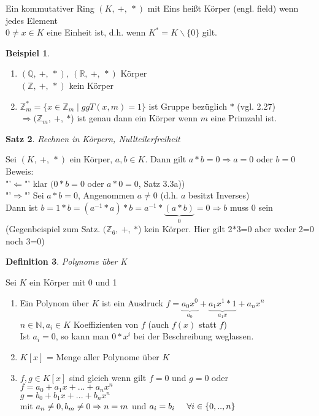 \documentclass[a4paper,11pt]{article}
\newtheorem{definition}{Definition}[section]
\newtheorem{satz}[definition]{Satz}
\newtheorem{bsp}[definition]{Beispiel}
\begin{document}
Ein kommutativer Ring $(K,\:+,\:*)$ mit Eins heißt Körper (engl. field) wenn jedes Element \\ 
$0\neq x\in K$ eine Einheit ist, d.h. wenn $K^*=K\backslash\{0\}$ gilt.
\begin{bsp}
\end{bsp}
\begin{enumerate}[label=\alph*)]
\item $(\mathbb{Q},\:+,\:*),\:(\mathbb{R},\:+,\:*)$ Körper \\
$(\mathbb{Z},\:+,\:*)$ kein Körper
\item $\mathbb{Z}^*_m=\{x\in\mathbb{Z}_m\mid ggT(x,m)=1\}$ ist Gruppe bezüglich \textcircled{$*$} (vgl. 2.27) \\
$\Rightarrow (\mathbb{Z}_m,\:$\textcircled{$+$}$,\:$\textcircled{$*$}) ist genau dann ein Körper wenn $m$ eine Primzahl ist.
\end{enumerate}
\begin{satz}
Rechnen in Körpern, Nullteilerfreiheit
\end{satz}
Sei $(K,\:+,\:*)$ ein Körper, $a,b\in K$. Dann gilt $a*b=0\Rightarrow a=0$ oder $b=0$ \\
Beweis: \\
"'$\Leftarrow$"' klar $(0*b=0$ oder $a*0=0$, Satz 3.3a)) \\
"'$\Rightarrow$"' Sei $a*b=0$, Angenommen $a\neq 0$ (d.h. $a$ besitzt Inverses) \\
Dann ist $b=1*b=(a^{-1}*a)*b=a^{-1}*\underbrace{(a*b)}_{0}=0\Rightarrow b$ muss 0 sein \\
(Gegenbeispiel zum Satz. $(\mathbb{Z}_6,\:$\textcircled{$+$}$,\:$\textcircled{$*$}) kein Körper. Hier gilt 2\textcircled{$*$}3=0 aber weder 2=0 noch 3=0)
\newpage
\begin{definition}
Polynome über K
\end{definition}
Sei $K$ ein Körper mit 0 und 1
\begin{enumerate}[label=\alph*)]
\item Ein Polynom über $K$ ist ein Ausdruck $f=\underbrace{a_0x^0}_{a_0}+\underbrace{a_1x^1*1}_{a_1x}+a_nx^n$ \\
$n\in\mathbb{N}, a_i\in K$ Koeffizienten von $f$ (auch $f(x)$ statt $f$) \\
Ist $a_i=0$, so kann man  $0*x^i$ bei der Beschreibung weglassen.
\item $K[x]$ = Menge aller Polynome über $K$
\item $f,g\in K[x]$ sind gleich wenn gilt $f=0$ und $g=0$ oder \\
$f=a_0+a_1x+...+a_nx^n$ \\
$g=b_0+b_1x+...+b_nx^n$ \\
mit $a_n\neq 0, b_m\neq 0 \\
\Rightarrow n=m$ und $a_i=b_i\hspace{5mm}\forall i\in\{0,..,n\}$
\end{enumerate}
\end{document}

